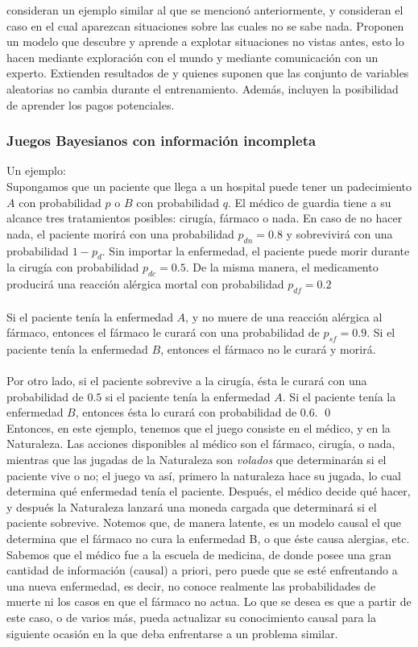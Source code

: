 \documentclass[11pt]{article}
\theoremstyle{plain}
\begin{document}
\cite{innes2018reasoning} consideran un ejemplo similar al que se mencionó anteriormente, y consideran el caso en el cual aparezcan situaciones sobre las cuales no se sabe nada. Proponen un modelo que descubre y aprende a explotar situaciones no vistas antes, esto lo hacen mediante exploración con el mundo y mediante comunicación con un experto. Extienden resultados de \cite{bramley2015staying} y \cite{albrecht2016exploiting} quienes suponen que las conjunto de variables aleatorias no cambia durante el entrenamiento. Además, incluyen la posibilidad de aprender los pagos potenciales.
\subsubsection{Juegos Bayesianos con información incompleta}
Un ejemplo:\\
Supongamos que un paciente que llega a un hospital puede tener un padecimiento $A$ con probabilidad $p$ o $B$ con probabilidad $q$. El médico de guardia tiene a su alcance tres tratamientos posibles: cirugía, fármaco o nada. En caso de no hacer nada, el paciente morirá con una probabilidad $p_{dn}=0.8$ y sobrevivirá con una probabilidad $1-p_d$. Sin importar la enfermedad, el paciente puede morir durante la cirugía con probabilidad $p_{dc}=0.5$. De la misma manera, el medicamento producirá una reacción alérgica mortal con probabilidad $p_{df}=0.2$\\
\\
Si el paciente tenía la enfermedad $A$, y no muere de una reacción alérgica al fármaco, entonces el fármaco le curará con una probabilidad de $p_{sf}=0.9$. Si el paciente tenía la enfermedad $B$, entonces el fármaco no le curará y morirá.\\
\\
Por otro lado, si el paciente sobrevive a la cirugía, ésta le curará con una probabilidad de $0.5$ si el paciente tenía la enfermedad $A$. Si el paciente tenía la enfermedad $B$, entonces ésta lo curará con probabilidad de $0.6$. \qed
\\
Entonces, en este ejemplo, tenemos que el juego consiste en el médico, y en la Naturaleza. Las acciones disponibles al médico son el fármaco, cirugía, o nada, mientras que las jugadas de la Naturaleza son \textit{volados} que determinarán si el paciente vive o no; el juego va así, primero la naturaleza hace su jugada, lo cual determina qué enfermedad tenía el paciente. Después, el médico decide qué hacer, y después la Naturaleza lanzará una moneda cargada que determinará si el paciente sobrevive. Notemos que, de manera latente, es un modelo causal el que determina que el fármaco no cura la enfermedad B, o que éste causa alergias, etc. 
\\
Sabemos que el médico fue a la escuela de medicina, de donde posee una gran cantidad de información (causal) a priori, pero puede que se esté enfrentando a una nueva enfermedad, es decir, no conoce realmente las probabilidades de muerte ni los casos en que el fármaco no actua. Lo que se desea es que a partir de este caso, o de varios más, pueda actualizar su conocimiento causal para la siguiente ocasión en la que deba enfrentarse a  un problema similar.
\end{document}

